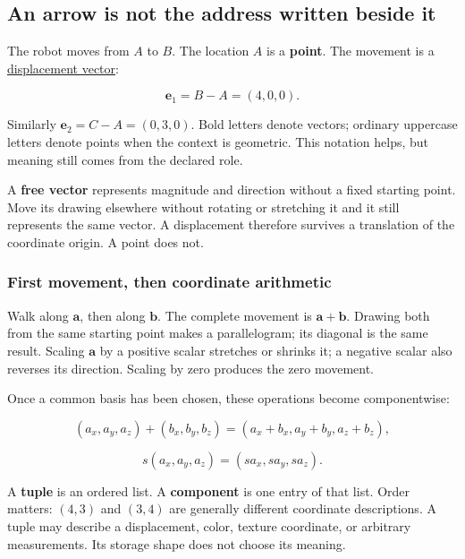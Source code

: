 \subsection{An arrow is not the address written beside it}\label{01-foundations-i-ch017-an-arrow-is-not-the-address-written-beside-it}

The robot moves from \(A\) to \(B\). The location \(A\) is a \textbf{point}. The movement is a \hyperref[01-foundations-i-ch017-an-arrow-is-not-the-address-written-beside-it]{displacement vector}:

\[
\mathbf e_1=B-A=(4,0,0).
\]

Similarly \(\mathbf e_2=C-A=(0,3,0)\). Bold letters denote vectors; ordinary uppercase letters denote points when the context is geometric. This notation helps, but meaning still comes from the declared role.

A \textbf{free vector} represents magnitude and direction without a fixed starting point. Move its drawing elsewhere without rotating or stretching it and it still represents the same vector. A displacement therefore survives a translation of the coordinate origin. A point does not.

\subsubsection{First movement, then coordinate arithmetic}\label{01-foundations-i-ch017-first-movement-then-coordinate-arithmetic}

Walk along \(\mathbf a\), then along \(\mathbf b\). The complete movement is \(\mathbf a+\mathbf b\). Drawing both from the same starting point makes a parallelogram; its diagonal is the same result. Scaling \(\mathbf a\) by a positive scalar stretches or shrinks it; a negative scalar also reverses its direction. Scaling by zero produces the zero movement.

Once a common basis has been chosen, these operations become componentwise:

\[
(a_x,a_y,a_z)+(b_x,b_y,b_z)
=(a_x+b_x,a_y+b_y,a_z+b_z),
\]

\[
s(a_x,a_y,a_z)=(sa_x,sa_y,sa_z).
\]

A \textbf{tuple} is an ordered list. A \textbf{component} is one entry of that list. Order matters: \((4,3)\) and \((3,4)\) are generally different coordinate descriptions. A tuple may describe a displacement, color, texture coordinate, or arbitrary measurements. Its storage shape does not choose its meaning.

